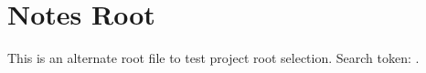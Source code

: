 \documentclass{article}
\begin{document}
\section{Notes Root}
This is an alternate root file to test project root selection.
Search token: .
\end{document}
